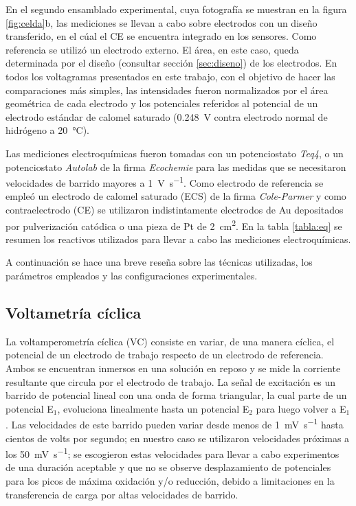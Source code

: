              En el segundo ensamblado experimental, cuya fotografía se muestran en la figura \ref{fig:celda}b, las mediciones se llevan a cabo sobre electrodos con un diseño transferido, en el cúal el CE se encuentra integrado en los sensores. Como referencia se utilizó un electrodo externo. El área, en este caso, queda determinada por el diseño (consultar sección \ref{sec:diseno}) de los electrodos. En todos los voltagramas presentados en este trabajo, con el objetivo de hacer las comparaciones más simples, las intensidades fueron normalizados por el área geométrica de cada electrodo y los potenciales referidos al potencial de un electrodo estándar de calomel saturado (\SI{0.248}{\volt} contra electrodo normal de hidrógeno a \SI{20}{\celsius})\cite{BANUS1941}.
					 		  
			 Las mediciones electroquímicas fueron tomadas con un potenciostato \textit{Teq4}, o un potenciostato \textit{Autolab} de la firma \textit{Ecochemie} para las medidas que se necesitaron velocidades de barrido mayores a \SI{1}{\volt\per\second}. Como electrodo de referencia se empleó un electrodo de calomel saturado (ECS) de la firma \textit{Cole-Parmer} y como contraelectrodo (CE) se utilizaron indistintamente electrodos de Au depositados por pulverización catódica o una pieza de Pt de \SI{2}{\square\cm}. En la tabla \ref{tabla:eq} se resumen los reactivos utilizados para llevar a cabo las mediciones electroquímicas. 
			
			 A continuación se hace una breve reseña sobre las técnicas utilizadas, los parámetros empleados y las configuraciones experimentales.

	 \subsection{Voltametría cíclica}
	 		
	 		La voltamperometría cíclica (VC) consiste en variar, de una manera cíclica, el potencial de un electrodo de trabajo respecto de un electrodo de referencia. Ambos se encuentran inmersos en una solución en reposo y se mide la corriente resultante que circula por el electrodo de trabajo. La señal de excitación es un barrido de potencial lineal con una onda de forma triangular, la cual parte de un potencial E$_1$, evoluciona linealmente hasta un potencial E$_2$ para luego volver a E$_1$. Las velocidades de este barrido pueden variar desde menos de \SI{1}{\milli\volt.\second^{-1}} hasta cientos de volts por segundo; en nuestro caso se utilizaron velocidades próximas a los \SI{50}{\milli\volt.\second^{-1}}; se escogieron estas velocidades para llevar a cabo experimentos de una duración aceptable y que no se observe desplazamiento de potenciales para los picos de máxima oxidación y/o reducción, debido a limitaciones en la transferencia de carga por altas velocidades de barrido. \cite{nicholson1964,Gewirth2004}

